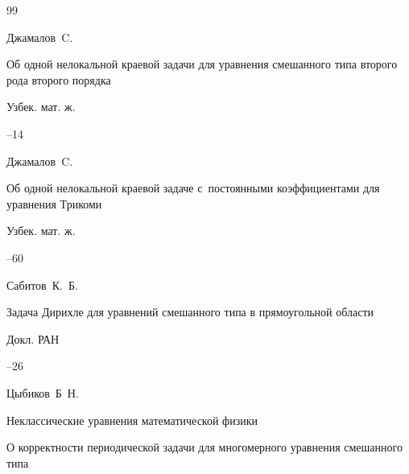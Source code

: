 \begin{thebibliography}{99}















\by Джамалов~C.

\paper  Об одной нелокальной краевой задачи для уравнения смешанного типа второго рода второго порядка

\jour Узбек. мат. ж.



--14




\by Джамалов~C.

\paper Об одной нелокальной краевой задаче с~постоянными коэффициентами для уравнения Трикоми

\jour Узбек. мат. ж.



--60










\by Сабитов~К.~Б.

\paper Задача Дирихле для уравнений смешанного типа в прямоугольной области

\jour Докл. РАН




--26






\by Цыбиков~Б~Н.

\inbook Неклассические уравнения математической физики

\paper  О корректности периодической задачи для многомерного уравнения смешанного типа


\end{thebibliography}
